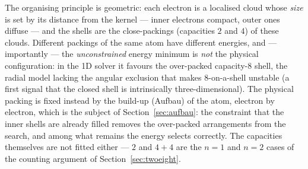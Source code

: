 \documentclass[11pt]{article}
\begin{document}
The organising principle is geometric: each electron is a localised cloud whose
\emph{size} is set by its distance from the kernel --- inner electrons compact, outer
ones diffuse --- and the shells are the close-packings (capacities $2$ and $4$) of these
clouds. Different packings of the same atom have different energies, and ---
importantly --- the \emph{unconstrained} energy minimum is \emph{not} the physical
configuration: in the 1D solver it favours the over-packed capacity-8 shell, the radial
model lacking the angular exclusion that makes 8-on-a-shell unstable (a first signal
that the closed shell is intrinsically three-dimensional). The physical packing is fixed
instead by the build-up (Aufbau) of the atom, electron by electron, which is the subject of
Section~\ref{sec:aufbau}: the constraint that the inner shells are already filled removes
the over-packed arrangements from the search, and among what remains the energy selects
correctly. The capacities themselves are not fitted either --- $2$ and $4{+}4$ are the
$n=1$ and $n=2$ cases of the counting argument of Section~\ref{sec:twoeight}.
\end{document}
